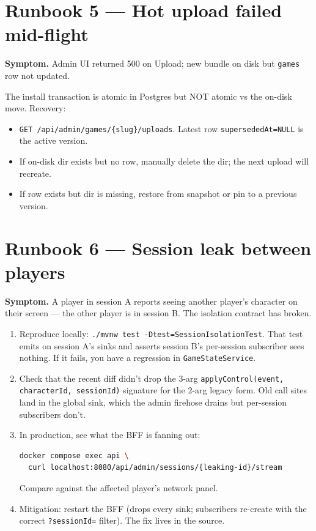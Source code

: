 \documentclass[11pt,a4paper,openany]{book}
\begin{document}
\chapter{Runbook 5 --- Hot upload failed mid-flight}

\textbf{Symptom.} Admin UI returned 500 on Upload; new bundle on disk
but \texttt{games} row not updated.

The install transaction is atomic in Postgres but NOT atomic vs the
on-disk move. Recovery:
\begin{itemize}
  \item \texttt{GET /api/admin/games/\{slug\}/uploads}. Latest row
        \texttt{supersededAt=NULL} is the active version.
  \item If on-disk dir exists but no row, manually delete the dir; the
        next upload will recreate.
  \item If row exists but dir is missing, restore from snapshot or pin
        to a previous version.
\end{itemize}

\chapter{Runbook 6 --- Session leak between players}
\textbf{Symptom.} A player in session A reports seeing another player's
character on their screen --- the other player is in session B. The
isolation contract has broken.

\begin{enumerate}
  \item Reproduce locally: \texttt{./mvnw test -Dtest=SessionIsolationTest}.
        That test emits on session A's sinks and asserts session B's
        per-session subscriber sees nothing. If it fails, you have a
        regression in \texttt{GameStateService}.
  \item Check that the recent diff didn't drop the 3-arg
        \texttt{applyControl(event, characterId, sessionId)} signature
        for the 2-arg legacy form. Old call sites land in the global
        sink, which the admin firehose drains but per-session
        subscribers don't.
  \item In production, see what the BFF is fanning out:
\begin{lstlisting}[language=bash,xleftmargin=4mm]
docker compose exec api \
  curl localhost:8080/api/admin/sessions/{leaking-id}/stream
\end{lstlisting}
        Compare against the affected player's network panel.
  \item Mitigation: restart the BFF (drops every sink; subscribers
        re-create with the correct \texttt{?sessionId=} filter). The
        fix lives in the source.
\end{enumerate}
\end{document}
